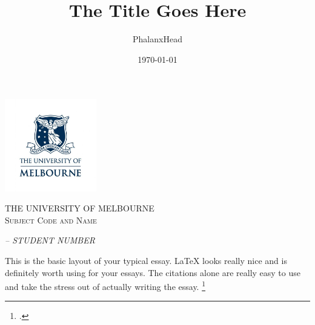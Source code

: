 \documentclass[twoside, a4paper, 12pt]{article}
\title{The Title Goes Here}
\author{PhalanxHead}
\date{\today}
\begin{document}
\begin{titlepage}
    \centering
    \includegraphics[width=0.3\textwidth]{UniLogo.jpg}\par\vspace{1cm}
    {\scshape\Large THE UNIVERSITY OF MELBOURNE \\
              \large Subject Code and Name \par} %
    \vspace{1.5cm}
    {\Huge \thetitle \par}
    \vfill

    {\Large\itshape \theauthor \hspace{1em} -- \hspace{1em} STUDENT NUMBER \par}
    \vspace{1.5cm}
    {\Large \thedate}
\end{titlepage}
\pagestyle{plain}

This is the basic layout of your typical essay. {\LaTeX} looks really nice
and is definitely worth using for your essays. The citations alone are really
easy to use and take the stress out of actually writing the essay. \footcite{PhalanxHead_2017}
\par\vspace{1em}

\lipsum[1-5]

\nocite{*}
\newpage

\printbibliography
\end{document}
